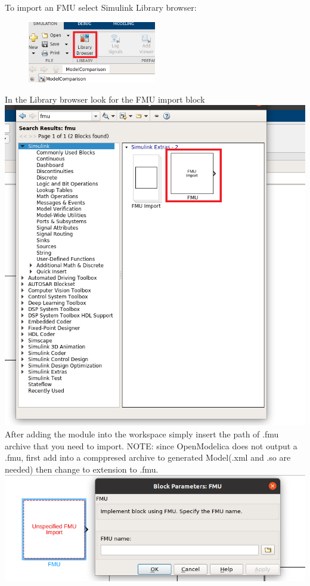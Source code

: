 \newline
To import an FMU select Simulink Library browser:
\newline
\begin{figure}[ht]
\centering
\includegraphics[width=0.5\textwidth]{LibBrowser.png}
\end{figure}
\newline
In the Library browser look for the FMU import block
\newline
\includegraphics[width=1\textwidth]{FmuImport.png}
\newline
After adding the module into the workspace simply insert the path of .fmu archive that you need to import. 
\newline
NOTE: since OpenModelica does not output a .fmu, first add into a comppresed archive to generated Model(.xml and .so are needed) then change to extension to .fmu.
\newline
\includegraphics[width=1\textwidth]{FmuImport2.png}
